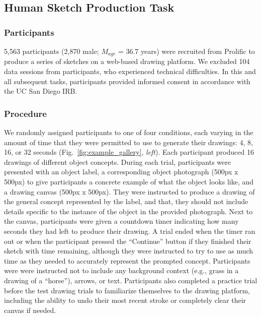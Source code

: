 \documentclass[10pt,letterpaper]{article}
\begin{document}
\subsection{Human Sketch Production Task} 
\subsubsection{Participants} 
5,563 participants (2,870 male; $M_{age}$ = 36.7 years) were recruited from Prolific to produce a series of sketches on a web-based drawing platform. 
We excluded 104 data sessions from participants, who experienced technical difficulties.
In this and all subsequent tasks, participants provided informed consent in accordance with the UC San Diego IRB.

\subsubsection{Procedure}
 We randomly assigned participants to one of four conditions, each varying in the amount of time that they were permitted to use to generate their drawings: 4, 8, 16, or 32 seconds (Fig.~\ref{fig:example_gallery}, \textit{left}). 
Each participant produced 16 drawings of different object concepts.
During each trial, participants were presented with an object label, a corresponding object photograph (500px x 500px) to give participants a concrete example of what the object looks like, and a drawing canvas (500px x 500px). 
They were instructed to produce a drawing of the general concept represented by the label, and that, they should not include details specific to the instance of the object in the provided photograph. 
Next to the canvas, participants were given a countdown timer indicating how many seconds they had left to produce their drawing. 
A trial ended when the timer ran out or when the participant pressed the ``Continue'' button if they finished their sketch with time remaining, although they were instructed to try to use as much time as they needed to accurately represent the prompted concept.
Participants were were instructed not to include any background context (e.g., grass in a drawing of a ``horse''), arrows, or text.
Participants also completed a practice trial before the test drawing trials to familiarize themselves to the drawing platform, including the ability to undo their most recent stroke or completely clear their canvas if needed. 
\end{document}
